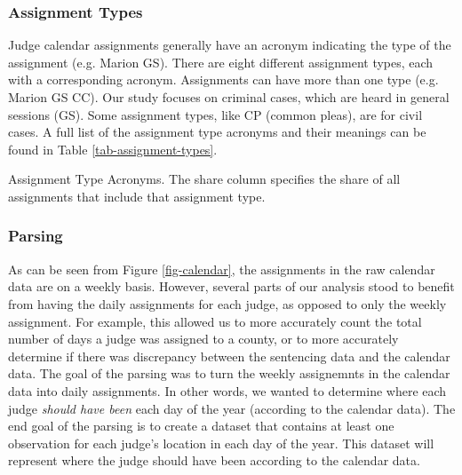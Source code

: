 \documentclass[11pt]{article}
\theoremstyle{ModifiedStyle}
\begin{document}
    \subsubsection{Assignment Types}
      Judge calendar assignments generally have an acronym indicating the type of the assignment (e.g. Marion GS). There are eight different assignment types, each with a corresponding acronym. Assignments can have more than one type (e.g. Marion GS CC). Our study focuses on criminal cases, which are heard in general sessions (GS). Some assignment types, like CP (common pleas), are for civil cases. A full list of the assignment type acronyms and their meanings can be found in Table \ref{tab-assignment-types}.

      \begin{table}[H]
        \centering
        \caption{Assignment Type Acronyms. The share column specifies the share of all assignments that include that assignment type.}
        \label{tab-assignment-types}
        
      \end{table}


    \subsubsection{Parsing}
      As can be seen from Figure \ref{fig-calendar}, the assignments in the raw calendar data are on a weekly basis. However, several parts of our analysis stood to benefit from having the daily assignments for each judge, as opposed to only the weekly assignment. For example, this allowed us to more accurately count the total number of days a judge was assigned to a county, or to more accurately determine if there was discrepancy between the sentencing data and the calendar data. The goal of the parsing was to turn the weekly assignemnts in the calendar data into daily assignments. In other words, we wanted to determine where each judge \textit{should have been} each day of the year (according to the calendar data). The end goal of the parsing is to create a dataset that contains at least one observation for each judge's location in each day of the year. This dataset will represent where the judge should have been according to the calendar data.
\end{document}
